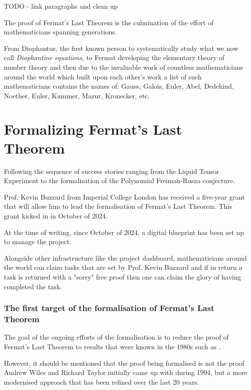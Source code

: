 
TODO - link paragraphs and clean up

The proof of Fermat's Last Theorem is the culmination of the effort of mathematicians spanning generations.

From Diophantus, the first known person to systematically study what we now call \textit{Diophantine equations}, to Fermat developing the elementary theory of number theory and then due to the invaluable work of countless mathematicians 
around the world which built upon each other's work a list of such mathematicians contains the names of: Gauss, Galois, Euler, Abel, Dedekind, Noether, Euler, Kummer, Mazur, Kronecker, etc.



\section{Formalizing Fermat's Last Theorem}

Following the sequence of success stories ranging from the Liquid Tensor Experiment to the formalisation of the Polynomial Freiman-Rusza conjecture. 

Prof. Kevin Buzzard from Imperial College London has received a five-year grant that will allow him to lead the formalisation of Fermat's Last Theorem. This grant kicked in in October of 2024. 

At the time of writing, since October of 2024, a digital blueprint has been set up to manage the project.

Alongside other infrastructure like the project dashboard, mathematicians around the world can claim tasks that are set by Prof. Kevin Buzzard and if in return a task is returned with a "sorry" free proof then one can claim the glory of having completed the task.

\subsubsection{The first target of the formalisation of Fermat's Last Theorem}

The goal of the ongoing efforts of the formalisation is to reduce the proof of Fermat's Last Theorem to results that were known in the 1980s such as .

However, it should be mentioned that the proof being formalised is not the proof Andrew Wiles and Richard Taylor initially came up with during 1994, but a more modernised approach that has been refined over the last 20 years.

